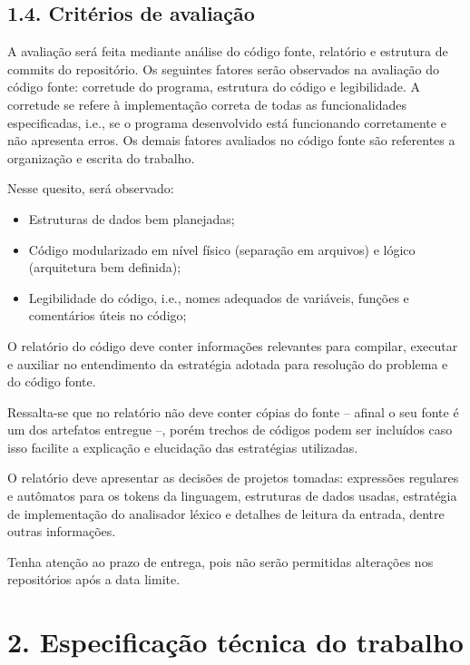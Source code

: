 \documentclass[a4paper,11pt]{article}
\begin{document}
\subsection*{1.4. Critérios de avaliação}
\label{sec:orgb8b699b}

A avaliação será feita mediante análise do código fonte,
relatório e estrutura de commits do repositório.
Os seguintes fatores serão observados na avaliação do código
fonte: corretude do programa, estrutura do código
e legibilidade. A corretude se refere à implementação correta
de todas as funcionalidades especificadas, i.e., se o programa
desenvolvido está funcionando corretamente e não apresenta erros.
Os demais fatores avaliados no código fonte são referentes a
organização e escrita do trabalho.

Nesse quesito, será observado:

\begin{itemize}
\item Estruturas de dados bem planejadas;

\item Código modularizado em nível físico (separação em arquivos)
e lógico (arquitetura bem definida);

\item Legibilidade do código, i.e., nomes adequados de variáveis,
funções e comentários úteis no código;
\end{itemize}

O relatório do código deve conter informações relevantes para
compilar, executar e auxiliar no entendimento da estratégia adotada
para resolução do problema e do código fonte.

Ressalta-se que no relatório não deve conter cópias do fonte --
afinal o seu fonte é um dos artefatos entregue --, porém trechos de
códigos podem ser incluídos caso isso facilite a explicação e
elucidação das estratégias utilizadas.

O relatório deve apresentar as decisões de projetos tomadas:
expressões regulares e autômatos para os tokens da linguagem,
estruturas de dados usadas, estratégia de implementação do analisador
léxico e detalhes de leitura da entrada, dentre outras informações.

Tenha atenção ao prazo de entrega, pois não serão permitidas
alterações nos repositórios após a data limite.
\section*{2. Especificação técnica do trabalho}
\label{sec:org7a67e82}
\end{document}
